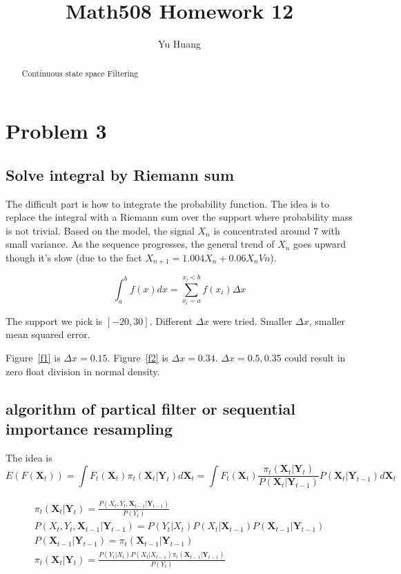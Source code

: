 \documentclass[a4paper,10pt]{article}
\title{Math508 Homework 12}
\author{Yu Huang}
\begin{document}
\maketitle

\begin{abstract}
Continuous state space Filtering
\end{abstract}

\section{Problem 3}
\subsection{Solve integral by Riemann sum}
The difficult part is how to integrate the probability function. The idea is to replace the integral with a Riemann sum over the support where probability mass is not trivial. Based on the model, the signal $X_n$ is concentrated around 7 with small variance. As the sequence progresses, the general trend of $X_n$ goes upward though it's slow (due to the fact $X_{n+1} = 1.004X_n + 0.06X_nVn$).

\begin{equation}
\int_a^b f(x) dx = \sum_{x_i=a}^{x_i<b} f(x_i) \Delta x
\end{equation}


The support we pick is $[-20, 30]$. Different $\Delta x$ were tried. Smaller $\Delta x$, smaller mean squared error.


Figure~\ref{f1} is $\Delta x=0.15$. Figure~\ref{f2} is $\Delta x=0.34$. $\Delta x=0.5, 0.35$ could result in zero float division in normal density.


\subsection{algorithm of partical filter or sequential importance resampling}
The idea is 
\begin{equation}
E(F(\mathbf{X}_t)) = \int F_t(\mathbf{X}_t) \pi_t(\mathbf{X}_t|\mathbf{Y}_t) d\mathbf{X}_t = \int F_t(\mathbf{X}_t) \frac{\pi_t(\mathbf{X}_t|\mathbf{Y}_t)}{P(\mathbf{X}_t|\mathbf{Y}_{t-1})} P(\mathbf{X}_t|\mathbf{Y}_{t-1}) d\mathbf{X}_t
\end{equation}


\begin{eqnarray}
\pi_t(\mathbf{X}_t|\mathbf{Y}_t) = \frac{P(X_t, Y_t, \mathbf{X}_{t-1}|\mathbf{Y}_{t-1})}{P(Y_t)} \\
P(X_t, Y_t, \mathbf{X}_{t-1}|\mathbf{Y}_{t-1}) = P(Y_t|X_t)P(X_t|\mathbf{X}_{t-1})P(\mathbf{X}_{t-1}|\mathbf{Y}_{t-1}) \\
P(\mathbf{X}_{t-1}|\mathbf{Y}_{t-1}) = \pi_t(\mathbf{X}_{t-1}|\mathbf{Y}_{t-1}) \\
\pi_t(\mathbf{X}_t|\mathbf{Y}_t) = \frac{P(Y_t|X_t)P(X_t|X_{t-1})\pi_t(\mathbf{X}_{t-1}|\mathbf{Y}_{t-1})}{P(Y_t)}
\end{eqnarray}
\end{document}
